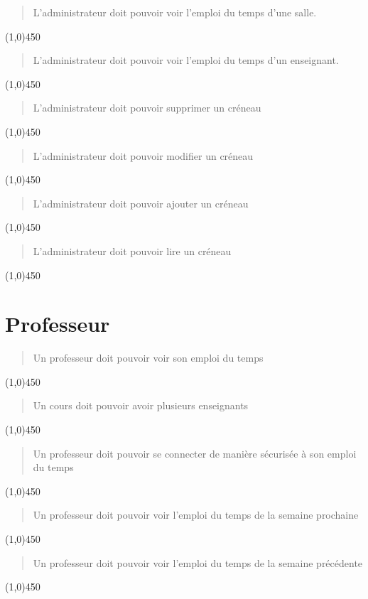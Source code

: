 \documentclass[a4paper,french,final]{memoir}
\begin{document}
\begin{quote}
    L'administrateur doit pouvoir voir l'emploi du temps d'une salle.
\end{quote}
\line(1,0){450}

\begin{quote}
    L'administrateur doit pouvoir voir l'emploi du temps d'un enseignant.
\end{quote}
\line(1,0){450}

\begin{quote}
    L'administrateur doit pouvoir supprimer un créneau
\end{quote}
\line(1,0){450}


\begin{quote}
    L'administrateur doit pouvoir modifier un créneau
\end{quote}
\line(1,0){450}

\begin{quote}
    L'administrateur doit pouvoir ajouter un créneau
\end{quote}
\line(1,0){450}

\begin{quote}
    L'administrateur doit pouvoir lire un créneau
\end{quote}
\line(1,0){450}


\section{Professeur}

\begin{quote}
    Un professeur doit pouvoir voir son emploi du temps
\end{quote}
\line(1,0){450}


\begin{quote}
    Un cours doit pouvoir avoir plusieurs enseignants
\end{quote}
\line(1,0){450}

\begin{quote}
    Un professeur doit pouvoir se connecter de manière sécurisée à son emploi du temps
\end{quote}
\line(1,0){450}

\begin{quote}
    Un professeur doit pouvoir voir l'emploi du temps de la semaine prochaine
\end{quote}
\line(1,0){450}

\begin{quote}
    Un professeur doit pouvoir voir l'emploi du temps de la semaine précédente
\end{quote}
\line(1,0){450}
\end{document}
